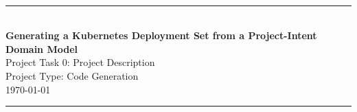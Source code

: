 \begin{titlepage}

\newcommand{\HRule}{\rule{\linewidth}{0.5mm}} %
\begin{center}
~\vspace{2cm}  %

\HRule \\[0.6cm] %
\textbf{\LARGE Generating a Kubernetes Deployment Set from a Project-Intent Domain Model} \\[0.3cm]
Project Task 0: Project Description \\
Project Type: Code Generation \\
\today\\[0.4cm] %
\HRule \\[1.2cm]
\\[0.4cm]
\\
\\
\end{center}
\newpage
\end{titlepage}
